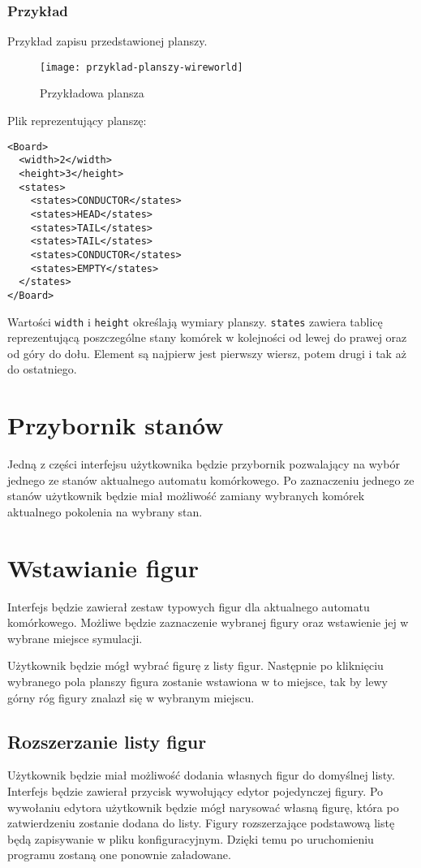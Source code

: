 \documentclass{report}
\begin{document}
\subsubsection{Przykład}
Przykład zapisu przedstawionej planszy. 

\begin{figure}[H]
    \centering
    \texttt{[image: przyklad-planszy-wireworld]}
    \caption{Przykładowa plansza}
\end{figure}

\begin{samepage}
\noindent{}Plik reprezentujący planszę:
\begin{verbatim}
<Board>
  <width>2</width>
  <height>3</height>
  <states>
    <states>CONDUCTOR</states>
    <states>HEAD</states>
    <states>TAIL</states>
    <states>TAIL</states>
    <states>CONDUCTOR</states>
    <states>EMPTY</states>
  </states>
</Board>
\end{verbatim}
\end{samepage}
Wartości \texttt{width} i \texttt{height} określają wymiary planszy.
\texttt{states} zawiera tablicę reprezentującą poszczególne stany komórek w kolejności od lewej do prawej oraz od góry do dołu. Element są najpierw jest pierwszy wiersz, potem drugi i tak aż do ostatniego.


\section{Przybornik stanów}
Jedną z części interfejsu użytkownika będzie przybornik pozwalający na wybór jednego ze stanów aktualnego automatu komórkowego. Po zaznaczeniu jednego ze stanów użytkownik będzie miał możliwość zamiany wybranych komórek aktualnego pokolenia na wybrany stan.

\section{Wstawianie figur}
Interfejs będzie zawierał zestaw typowych figur dla aktualnego automatu komórkowego. Możliwe będzie zaznaczenie wybranej figury oraz wstawienie jej w wybrane miejsce symulacji.

Użytkownik będzie mógł wybrać figurę z listy figur. Następnie po kliknięciu wybranego pola planszy figura zostanie wstawiona w to miejsce, tak by lewy górny róg figury znalazł się w wybranym miejscu.

\subsection{Rozszerzanie listy figur}
Użytkownik będzie miał możliwość dodania własnych figur do domyślnej listy.
Interfejs będzie zawierał przycisk wywołujący edytor pojedynczej figury. Po wywołaniu edytora użytkownik będzie mógł narysować własną figurę, która po zatwierdzeniu zostanie dodana do listy.
Figury rozszerzające podstawową listę będą zapisywanie w pliku konfiguracyjnym. Dzięki temu po uruchomieniu programu zostaną one ponownie załadowane. 
\end{document}
